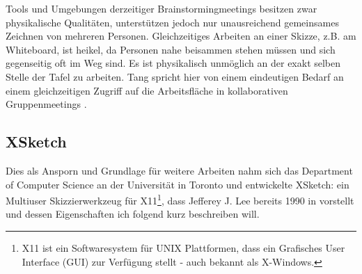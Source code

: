 Tools und Umgebungen derzeitiger Brainstormingmeetings besitzen zwar physikalische Qualitäten, unterstützen jedoch nur unausreichend gemeinsames Zeichnen von mehreren Personen. Gleichzeitiges Arbeiten an einer Skizze, z.B. am Whiteboard, ist heikel, da Personen nahe beisammen stehen müssen und sich gegenseitig oft im Weg sind. Es ist physikalisch unmöglich an der exakt selben Stelle der Tafel zu arbeiten. Tang spricht hier von einem eindeutigen Bedarf an einem gleichzeitigen Zugriff auf die Arbeitsfläche in kollaborativen Gruppenmeetings \citep{Tang1991143}.

\subsection{XSketch}
Dies als Ansporn und Grundlage für weitere Arbeiten nahm sich das Department of Computer Science an der Universität in Toronto und entwickelte XSketch: ein Multiuser Skizzierwerkzeug für X11\footnote{X11 ist ein Softwaresystem für UNIX Plattformen, dass ein Grafisches User Interface (GUI) zur Verfügung stellt - auch bekannt als X-Windows.}, dass Jefferey J. Lee bereits 1990 in \citep{Lee:1990:XMS:91478.91510} vorstellt und dessen Eigenschaften ich folgend kurz beschreiben will.

